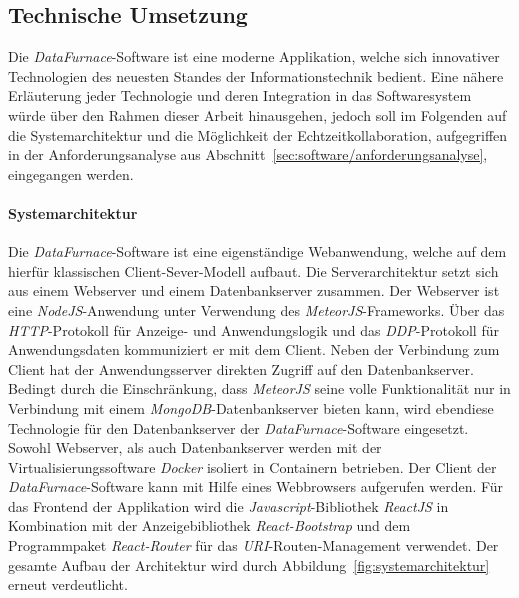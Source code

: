 \documentclass[
  language=german, %
  type=bachelor,%
  ngerman
]{isthesis}
\begin{document}
\begin{content}
  \section{Technische Umsetzung}\label{sec:technische-umsetzung}


  Die \textit{DataFurnace}-Software ist eine moderne Applikation, welche sich
  innovativer Technologien des neuesten Standes der Informationstechnik
  bedient. Eine nähere Erläuterung jeder Technologie und deren Integration in das
  Softwaresystem würde über den Rahmen dieser Arbeit hinausgehen, jedoch soll
  im Folgenden auf die Systemarchitektur und die Möglichkeit der
  Echtzeitkollaboration, aufgegriffen in der Anforderungsanalyse aus
  Abschnitt~\ref{sec:software/anforderungsanalyse}, eingegangen werden.

  \paragraph{Systemarchitektur}
  Die \textit{DataFurnace}-Software ist eine eigenständige  Webanwendung,
  welche auf dem hierfür klassischen Client-Sever-Modell aufbaut. Die
  Serverarchitektur setzt sich aus einem Webserver und einem Datenbankserver
  zusammen. Der Webserver ist eine \textit{NodeJS}-Anwendung unter Verwendung
  des \textit{MeteorJS}-Frameworks. Über das \textit{HTTP}-Protokoll für
  Anzeige- und Anwendungslogik und das \textit{DDP}-Protokoll für
  Anwendungsdaten kommuniziert er mit dem Client. Neben der Verbindung zum
  Client hat der Anwendungsserver direkten Zugriff auf den Datenbankserver.
  Bedingt durch die Einschränkung, dass \textit{MeteorJS} seine volle
  Funktionalität nur in Verbindung mit einem \textit{MongoDB}-Datenbankserver
  bieten kann, wird ebendiese Technologie für den Datenbankserver der
  \textit{DataFurnace}-Software eingesetzt. Sowohl Webserver, als auch
  Datenbankserver werden mit der Virtualisierungssoftware \textit{Docker}
  isoliert in Containern betrieben.  Der Client der
  \textit{DataFurnace}-Software kann mit Hilfe eines Webbrowsers aufgerufen
  werden. Für das Frontend der Applikation wird die
  \textit{Javascript}-Bibliothek \textit{ReactJS} in Kombination mit der
  Anzeigebibliothek \textit{React-Bootstrap} und dem Programmpaket
  \textit{React-Router} für das \textit{URI}-Routen-Management verwendet.  Der
  gesamte Aufbau der Architektur wird durch
  Abbildung~\ref{fig:systemarchitektur} erneut verdeutlicht.


\end{content}
\end{document}

